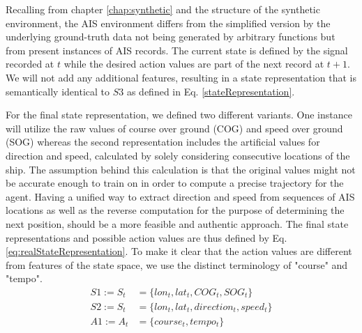 Recalling from chapter \ref{chap:synthetic} and the structure of the synthetic environment, the AIS environment differs from the simplified version by the underlying ground-truth data not being generated by arbitrary functions but from present instances of AIS records. The current state is defined by the signal recorded at $t$ while the desired action values are part of the next record at $t+1$. We will not add any additional features, resulting in a state representation that is semantically identical to $S3$ as defined in Eq. \ref{stateRepresentation}.
\par
For the final state representation, we defined two different variants. One instance will utilize the raw values of course over ground (COG) and speed over ground (SOG) whereas the second representation includes the artificial values for direction and speed, calculated by solely considering consecutive locations of the ship. The assumption behind this calculation is that the original values might not be accurate enough to train on in order to compute a precise trajectory for the agent. Having a unified way to extract direction and speed from sequences of AIS locations as well as the reverse computation for the purpose of determining the next position, should be a more feasible and authentic approach. The final state representations and possible action values are thus defined by Eq. \ref{eq:realStateRepresentation}. To make it clear that the action values are different from features of the state space, we use the distinct terminology of "course" and "tempo".
\begin{equation}
\begin{aligned}
    S1 := S_t &= \{lon_t, lat_t, COG_t, SOG_t\}
\\
    S2 := S_t &= \{lon_t,lat_t, direction_t, speed_t\}
\\
    A1 := A_t &= \{course_t, tempo_t\}
    \end{aligned}
\end{equation} \label{eq:realStateRepresentation}

